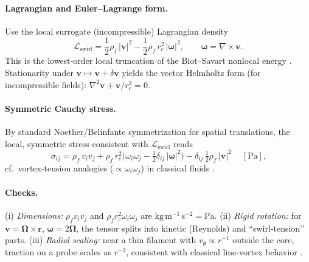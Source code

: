 \documentclass[10pt,reprint,aps,onecolumn,nofootinbib]{revtex4-2}
\begin{document}
    \paragraph{Lagrangian and Euler–Lagrange form.}
        Use the local surrogate (incompressible) Lagrangian density
        \begin{equation}
        \mathcal{L}_{\text{swirl}}=\frac{1}{2}\rho_{\!f}\,|\mathbf{v}|^{2}
        -\frac{1}{2}\rho_{\!f}\,r_c^{2}\,|\boldsymbol{\omega}|^{2},
        \qquad \boldsymbol{\omega}=\nabla\times\mathbf{v}.
        \end{equation}
        This is the lowest‐order local truncation of the Biot–Savart nonlocal energy
        \cite{Saffman1992,Batchelor1967,LandauFM}.
        Stationarity under \(\mathbf{v}\mapsto \mathbf{v}+\delta\mathbf{v}\) yields the vector Helmholtz form
        (for incompressible fields): \(\nabla^{2}\mathbf{v}+\mathbf{v}/r_c^{2}=0\).

    \paragraph{Symmetric Cauchy stress.}
        By standard Noether/Belinfante symmetrization for spatial translations, the local, symmetric stress consistent with \(\mathcal{L}_{\text{swirl}}\) reads
        \begin{equation}
        \boxed{~
        \sigma_{ij}
            =\rho_{\!f}\,v_i v_j
            +\rho_{\!f}\,r_c^{2}\Big(\omega_i\omega_j-\tfrac12 \delta_{ij}\,|\boldsymbol{\omega}|^{2}\Big)
            -\delta_{ij}\,\tfrac12 \rho_{\!f}\,|\mathbf{v}|^{2}
            ~}\quad [\mathrm{Pa}],
        \end{equation}
        cf.\ vortex-tension analogies (\( \propto \omega_i\omega_j\)) in classical fluids
        \cite{Saffman1992,Batchelor1967,LandauFM}.

    \paragraph{Checks.}
    (i) \emph{Dimensions:} \(\rho_{\!f}v_i v_j\) and
        \(\rho_{\!f} r_c^{2}\omega_i\omega_j\) are \(\mathrm{kg\,m^{-1}\,s^{-2}}=\mathrm{Pa}\).
        (ii) \emph{Rigid rotation:} for \(\mathbf{v}=\boldsymbol{\Omega}\times\mathbf{r}\),
        \(\boldsymbol{\omega}=2\boldsymbol{\Omega}\), the tensor splits into kinetic (Reynolds) and “swirl‐tension’’ parts.
        (iii) \emph{Radial scaling:} near a thin filament with \(v_\theta\propto r^{-1}\) outside the core, traction on a probe scales as \(r^{-2}\), consistent with classical line‐vortex behavior \cite{Saffman1992}.
\end{document}
